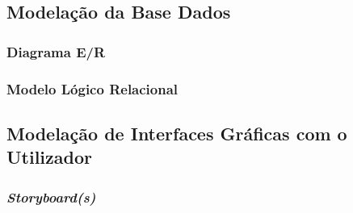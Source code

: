 \documentclass[12pt,a4paper,openright,oneside]{memoir}
\begin{document}

\subsection{Modelação da Base Dados}


\subsubsection{Diagrama E/R}
\subsubsection{Modelo Lógico Relacional}
\subsection{Modelação de Interfaces Gráficas com o Utilizador}


\subsubsection{\textit{Storyboard(s)}}
\end{document}
